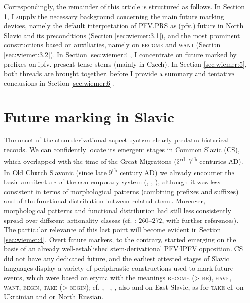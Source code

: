 \documentclass[output=paper,colorlinks,citecolor=brown]{langscibook}
\begin{document}
Correspondingly, the remainder of this article is structured as follows. In Section \ref{sec:wiemer:3}, I supply the necessary background concerning the main future marking devices, namely the default interpretation of PFV.PRS as (pfv.) future in North Slavic and its preconditions (Section \ref{sec:wiemer:3.1}), and the most prominent constructions based on auxiliaries, namely on \textsc{become} and \textsc{want} (Section \ref{sec:wiemer:3.2}). In Section \ref{sec:wiemer:4}, I concentrate on future marked by prefixes on ipfv. present tense stems (mainly in Czech). In Section \ref{sec:wiemer:5}, both threads are brought together, before I provide a summary and tentative conclusions in Section \ref{sec:wiemer:6}.



\section{Future marking in Slavic}\label{sec:wiemer:3}
The onset of the stem\hyp{}derivational aspect system clearly predates historical records. We can confidently locate its emergent stages in Common Slavic (CS), which overlapped with the time of the Great Migrations (3\textsuperscript{rd}--7\textsuperscript{th} centuries AD). In Old Church Slavonic (since late 9\textsuperscript{th} century AD) we already encounter the basic architecture of the contemporary system (\cite{EckhoffJanda2014}, \cite{eckhoff_2020}, \cite{Kamphuis2020}), although it was less consistent in terms of morphological patterns (combining prefixes and suffixes) and of the functional distribution between related stems. Moreover, morphological patterns and functional distribution had still less consistently spread over different actionality classes (cf. \cite{wiemer_serzant_2017}: 260--272, with further references). The particular relevance of this last point will become evident in Section \ref{sec:wiemer:4}. Overt future markers, to the contrary, started emerging on the basis of an already well-established stem\hyp{}derivational PFV:IPFV opposition. CS did not have any dedicated future, and the earliest attested stages of Slavic languages display a variety of periphrastic constructions used to mark future events, which were based on etyma with the meanings \textsc{become} (> \textsc{be}), \textsc{have}, \textsc{want}, \textsc{begin}, \textsc{take} (> \textsc{begin}); cf. \citet{Birnbaum1958}, \citet{Křížková1960}, \citet[174--185]{Večerka1993}, \citet[91--93]{Grković-Mejdžor2012}, also \citet[146--157]{Borkovskij1949} and \citet[]{seveleva2021} on East Slavic, as for \textsc{take} cf. \citet[18--26]{Danylenko2012} on Ukrainian and \citet[31]{andersen_2006b} on North Russian.
\end{document}
